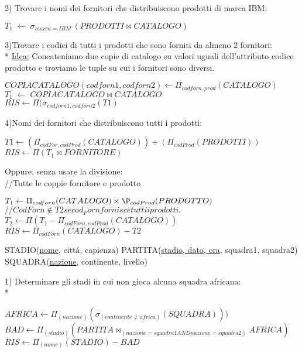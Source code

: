 \documentclass[10pt]{report}
\begin{document}
2) Trovare i nomi dei fornitori che distribuiscono prodotti di marca IBM:

\begin{center}
$ T _{1} \; \leftarrow \; \sigma _{marca=IBM} \, ( PRODOTTI \bowtie CATALOGO) $
\end{center}

3)Trovare i codici di tutti i prodotti che sono forniti da almeno 2 fornitori:\\*
\underline{Idea:} Concateniamo due copie di catalogo su valori uguali dell'attributo codice prodotto e troviamo le tuple su cui i fornitori sono diversi.

\begin{center}
$COPIACATALOGO(codforn1, codforn2) \leftarrow \Pi _{codforn, prod} (CATALOGO) $\\
$ T _{1} \; \leftarrow \; COPIACATALOGO \bowtie CATALOGO $\\
$RIS \leftarrow \Pi ( \sigma _{codforn1, codforn2} (T1)$\\
\end{center}

4)Nomi dei fornitori che distribuiscono tutti i prodotti:\\
\begin{center}
$T1 \leftarrow ( \Pi _{codFor,codProd}(CATALOGO)) \div (\Pi _{codProd}(PRODOTTI))$\\
$RIS \leftarrow \Pi ( T_{1} \bowtie FORNITORE )$\\
\end{center}
Oppure, senza usare la divisione:\\
	//Tutte le coppie fornitore e prodotto
\begin{center}
$T_{1} \leftarrow	 \Pi _{codforn}(CATALOGO) \times \P _{codProd} (PRODOTTO)$\\
$	//CodForn \notin T2 se cod_Forn fornisce tutti i prodotti.$\\
$T_{2} \leftarrow \Pi(T_{1} - \Pi _{codForn,codProd} (CATALOGO))$\\
$RIS \leftarrow \Pi _{codForn}(CATALOGO) - T2 $\\
\end{center}


STADIO(\underline{nome}, citt\'a, capienza)
PARTITA(\underline{stadio, dato, ora}, squadra1, squadra2)
SQUADRA(\underline{nazione}, continente, livello)

1) Determinare gli stadi in cui non gioca alcuna squadra africana:\\*

\begin{center}
$AFRICA \leftarrow \Pi _{(nazione)}(\sigma _{(continente \neq africa)}(SQUADRA)))$
$BAD \leftarrow \Pi _{(stadio)}(PARTITA \bowtie _{(nazione = squadra1 AND nazione = squadra2)} AFRICA)$
$RIS \leftarrow \Pi _{(nome)}(STADIO) - BAD $
\end{center}
\end{document}
